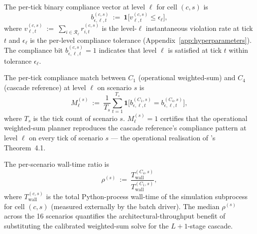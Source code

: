 \begin{definition}
\label{def:compliance-vector}
The per-tick binary compliance vector at level $\ell$ for cell $(c, s)$ is
\begin{equation}
    b_{\epsilon, \ell, t}^{(c, s)}\ :=\ \mathbf{1}\bigl[v_{\ell, t}^{(c, s)} \le \epsilon_{\ell}\bigr],
    \label{eq:compliance-bit}
\end{equation}
where $v_{\ell, t}^{(c, s)}\ :=\ \sum_{i \in \mathcal{R}_{\ell}} r_{i, t}^{(c, s)}$ is the level-$\ell$ instantaneous violation rate at tick $t$ and $\epsilon_{\ell}$ is the per-level compliance tolerance (Appendix~\ref{app:hyperparameters}). The compliance bit $b_{\epsilon, \ell, t}^{(c, s)} = 1$ indicates that level $\ell$ is satisfied at tick $t$ within tolerance $\epsilon_\ell$.
\end{definition}

\begin{definition}
\label{def:compliance-match}
The per-tick compliance match between $C_1$ (operational weighted-sum) and $C_4$ (cascade reference) at level $\ell$ on scenario $s$ is
\begin{equation}
    M_{\ell}^{(s)}\ :=\ \frac{1}{T_s}\sum_{t=1}^{T_s} \mathbf{1}\bigl[b_{\epsilon, \ell, t}^{(C_1, s)} = b_{\epsilon, \ell, t}^{(C_4, s)}\bigr],
    \label{eq:compliance-match}
\end{equation}
where $T_s$ is the tick count of scenario $s$. $M_{\ell}^{(s)} = 1$ certifies that the operational weighted-sum planner reproduces the cascade reference's compliance pattern at level $\ell$ on every tick of scenario $s$ --- the operational realisation of \cite{lcp2025}'s Theorem~4.1.
\end{definition}

\begin{definition}
\label{def:walltime-ratio}
The per-scenario wall-time ratio is
\begin{equation}
    \rho^{(s)}\ :=\ \frac{T_{\mathrm{wall}}^{(C_4, s)}}{T_{\mathrm{wall}}^{(C_1, s)}},
    \label{eq:walltime-ratio}
\end{equation}
where $T_{\mathrm{wall}}^{(c, s)}$ is the total Python-process wall-time of the simulation subprocess for cell $(c, s)$ (measured externally by the batch driver). The median $\rho^{(s)}$ across the 16 scenarios quantifies the architectural-throughput benefit of substituting the calibrated weighted-sum solve for the $L{+}1$-stage cascade.
\end{definition}

